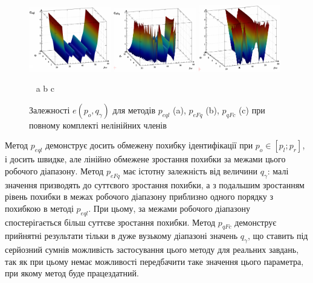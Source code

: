 \documentclass[a4paper,13pt]{atuaref}
\begin{document}
\begin{figure}[htb!]
  \centerline{
    \includegraphics[width=0.32\textwidth]{p3/p/qls_pe-p_po_qg_eql_all_xl.png}
    \hfill
    \includegraphics[width=0.32\textwidth]{p3/p/qls_pe-p_po_qg_eFq_all_xl.png}
    \hfill
    \includegraphics[width=0.32\textwidth]{p3/p/qls_pe-p_po_qg_eFc_all_xl.png}
  }
  \vspace{-1.5ex}
  \begin{center}
    ~ \hfill a \hfill\hfill b \hfill\hfill c \hfill ~
  \end{center}
  \vspace{-2.5ex}
  \caption{Залежності $e(p_o,q_\gamma)$ для методів $p_{eql}$ (a), $p_{eFq}$ (b), $p_{qFc}$ (c) при повному комплекті нелінійних членів}
  \label{atu:f:qsl_pe_po_qg_all}
\end{figure}

Метод $p_{eql}$ демонструє досить обмежену похибку ідентифікації при
$p_o \in [p_l; p_r]$, і досить швидке, але лінійно обмежене зростання похибки за
межами цього робочого діапазону. Метод $p_{eFq}$ має істотну залежність
від величини $q_\gamma$: малі значення призводять до суттєвого
зростання похибки, а з подальшим зростанням рівень похибки в межах робочого
діапазону приблизно одного порядку з похибкою в методі $p_{eql}$. При
цьому, за межами робочого діапазону спостерігається більш суттєве зростання
похибки. Метод $p_{qFc}$ демонструє прийнятні результати тільки в дуже
вузькому діапазоні значень $q_\gamma$, що ставить під серйозний сумнів
можливість застосування цього методу для реальних завдань, так як при цьому
немає можливості передбачити таке значення цього параметра, при якому метод буде
працездатний.
\end{document}
